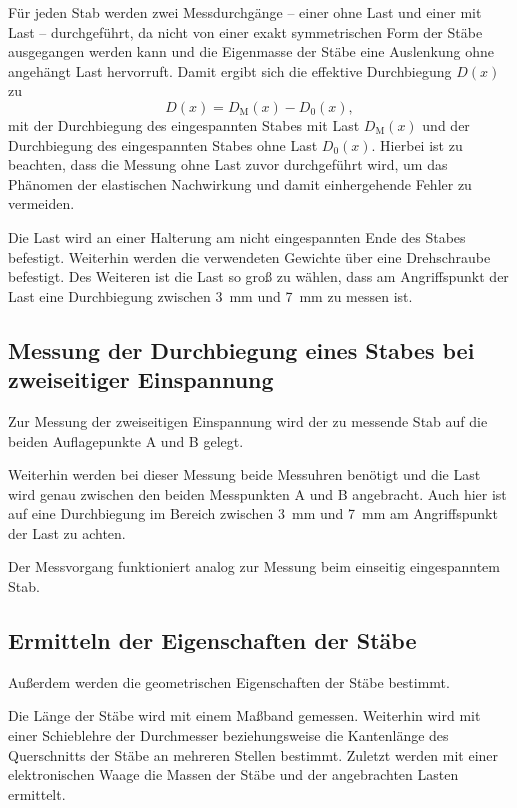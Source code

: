 Für jeden Stab werden zwei Messdurchgänge -- einer ohne Last und einer mit Last -- durchgeführt,
da nicht von einer exakt symmetrischen Form der Stäbe ausgegangen werden kann und die Eigenmasse
der Stäbe eine Auslenkung ohne angehängt Last hervorruft.
Damit ergibt sich die effektive Durchbiegung $D(x)$ zu
\begin{equation}
	D(x) = D_{\mathrm{M}}(x) - D_0(x) \mathrm{,}
\end{equation}
mit der Durchbiegung des eingespannten Stabes mit Last $D_{\mathrm{M}}(x)$ und der Durchbiegung
des eingespannten Stabes ohne Last $D_0(x)$.
Hierbei ist zu beachten, dass die Messung ohne Last zuvor durchgeführt wird, um das Phänomen
der elastischen Nachwirkung \cite{V102} und damit einhergehende Fehler zu vermeiden.

Die Last wird an einer Halterung am nicht eingespannten Ende des Stabes befestigt. Weiterhin
werden die verwendeten Gewichte über eine Drehschraube befestigt.
Des Weiteren ist die Last so groß zu wählen, dass am Angriffspunkt der Last eine Durchbiegung
zwischen \SI{3}{\milli\meter} und \SI{7}{\milli\meter} zu messen ist.

\subsection{Messung der Durchbiegung eines Stabes bei zweiseitiger Einspannung}
Zur Messung der zweiseitigen Einspannung wird der zu messende Stab auf die beiden Auflagepunkte
A und B gelegt.

Weiterhin werden bei dieser Messung beide Messuhren benötigt und die Last wird genau zwischen
den beiden Messpunkten A und B angebracht. Auch hier ist auf eine Durchbiegung im Bereich
zwischen \SI{3}{\milli\meter} und \SI{7}{\milli\meter} am Angriffspunkt der Last zu achten.

Der Messvorgang funktioniert analog zur Messung beim einseitig eingespanntem Stab.

\subsection{Ermitteln der Eigenschaften der Stäbe}
Außerdem werden die geometrischen Eigenschaften der Stäbe bestimmt.

Die Länge der Stäbe wird mit einem Maßband gemessen.
Weiterhin wird mit einer Schieblehre%
der Durchmesser beziehungsweise die Kantenlänge des Querschnitts der Stäbe an mehreren Stellen bestimmt.
Zuletzt werden mit einer elektronischen Waage die Massen der Stäbe und der angebrachten
Lasten ermittelt.
